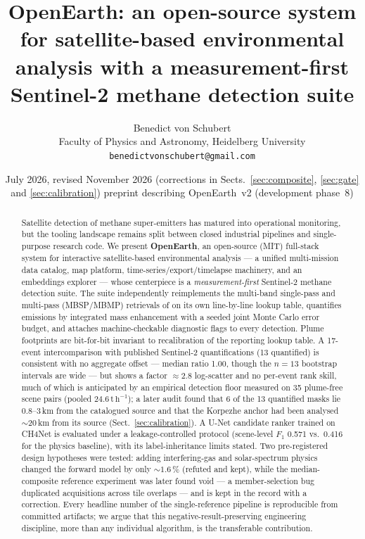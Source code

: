 \documentclass[11pt]{article}
\title{\textbf{OpenEarth: an open-source system for satellite-based
environmental analysis with a measurement-first Sentinel-2 methane
detection suite}}
\author{Benedict von Schubert\\[2pt]
\small Faculty of Physics and Astronomy, Heidelberg University\\
\small \texttt{benedictvonschubert@gmail.com}}
\date{\small July 2026, revised November 2026 (corrections in Sects.~\ref{sec:composite}, \ref{sec:gate} and \ref{sec:calibration}) \;\textperiodcentered\; preprint describing OpenEarth~v2 (development phase~8)}
\newcommand{\perh}{\ensuremath{\,\mathrm{t\,h^{-1}}}}
\begin{document}
\maketitle

\begin{abstract}
\noindent
Satellite detection of methane super-emitters has matured into
operational monitoring, but the tooling landscape remains split between
closed industrial pipelines and single-purpose research code. We present
\textbf{OpenEarth}, an open-source (MIT) full-stack system for
interactive satellite-based environmental analysis --- a unified
multi-mission data catalog, map platform, time-series/export/timelapse
machinery, and an embeddings explorer --- whose centerpiece is a
\emph{measurement-first} Sentinel-2 methane detection suite. The suite
independently reimplements the multi-band single-pass and multi-pass
(MBSP/MBMP) retrievals of \citet{varon2021} on its own line-by-line
lookup table, quantifies emissions by integrated mass enhancement with a
seeded joint Monte Carlo error budget, and attaches machine-checkable
diagnostic flags to every detection. Plume footprints are bit-for-bit
invariant to recalibration of the reporting lookup table. A 17-event
intercomparison with published Sentinel-2 quantifications (13 quantified)
is consistent with no aggregate offset --- median ratio 1.00, though the
$n{=}13$ bootstrap intervals are wide --- but shows a factor
${\approx}2.8$ log-scatter and no per-event rank skill, much of which is
anticipated by an empirical detection floor measured on 35 plume-free
scene pairs (pooled $24.6\perh$); a later audit found that 6 of the 13
quantified masks lie 0.8--3\,km from the catalogued source and that the
Korpezhe anchor had been analysed ${\sim}20$\,km from its source
(Sect.~\ref{sec:calibration}). A U-Net candidate ranker trained on CH4Net is evaluated
under a leakage-controlled protocol (scene-level $F_1$ 0.571 vs.\ 0.416
for the physics baseline), with its label-inheritance limits stated. Two
pre-registered design hypotheses were tested: adding interfering-gas and
solar-spectrum physics changed the forward model by only
${\sim}1.6\,\%$ (refuted and kept), while the median-composite reference
experiment was later found void --- a member-selection bug duplicated
acquisitions across tile overlaps --- and is kept in the record with a
correction. Every headline number of the
single-reference pipeline is reproducible from committed artifacts; we
argue that this negative-result-preserving engineering discipline, more
than any individual algorithm, is the transferable contribution.
\end{abstract}
\end{document}
